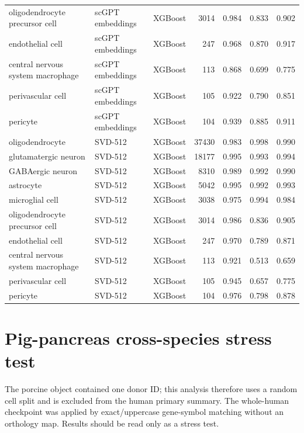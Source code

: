 {\begin{longtable}{>{\raggedright\arraybackslash}p{4.2cm}llrrrr}
oligodendrocyte precursor cell & scGPT embeddings & XGBoost & 3014 & 0.984 & 0.833 & 0.902 \\
endothelial cell & scGPT embeddings & XGBoost & 247 & 0.968 & 0.870 & 0.917 \\
central nervous system macrophage & scGPT embeddings & XGBoost & 113 & 0.868 & 0.699 & 0.775 \\
perivascular cell & scGPT embeddings & XGBoost & 105 & 0.922 & 0.790 & 0.851 \\
pericyte & scGPT embeddings & XGBoost & 104 & 0.939 & 0.885 & 0.911 \\
oligodendrocyte & SVD-512 & XGBoost & 37430 & 0.983 & 0.998 & 0.990 \\
glutamatergic neuron & SVD-512 & XGBoost & 18177 & 0.995 & 0.993 & 0.994 \\
GABAergic neuron & SVD-512 & XGBoost & 8310 & 0.989 & 0.992 & 0.990 \\
astrocyte & SVD-512 & XGBoost & 5042 & 0.995 & 0.992 & 0.993 \\
microglial cell & SVD-512 & XGBoost & 3038 & 0.975 & 0.994 & 0.984 \\
oligodendrocyte precursor cell & SVD-512 & XGBoost & 3014 & 0.986 & 0.836 & 0.905 \\
endothelial cell & SVD-512 & XGBoost & 247 & 0.970 & 0.789 & 0.871 \\
central nervous system macrophage & SVD-512 & XGBoost & 113 & 0.921 & 0.513 & 0.659 \\
perivascular cell & SVD-512 & XGBoost & 105 & 0.945 & 0.657 & 0.775 \\
pericyte & SVD-512 & XGBoost & 104 & 0.976 & 0.798 & 0.878 \\
\end{longtable}
}

\clearpage\section{Pig-pancreas cross-species stress test}

The porcine object contained one donor ID; this analysis therefore uses a random cell split and is excluded from the human primary summary. The whole-human checkpoint was applied by exact/uppercase gene-symbol matching without an orthology map. Results should be read only as a stress test.

